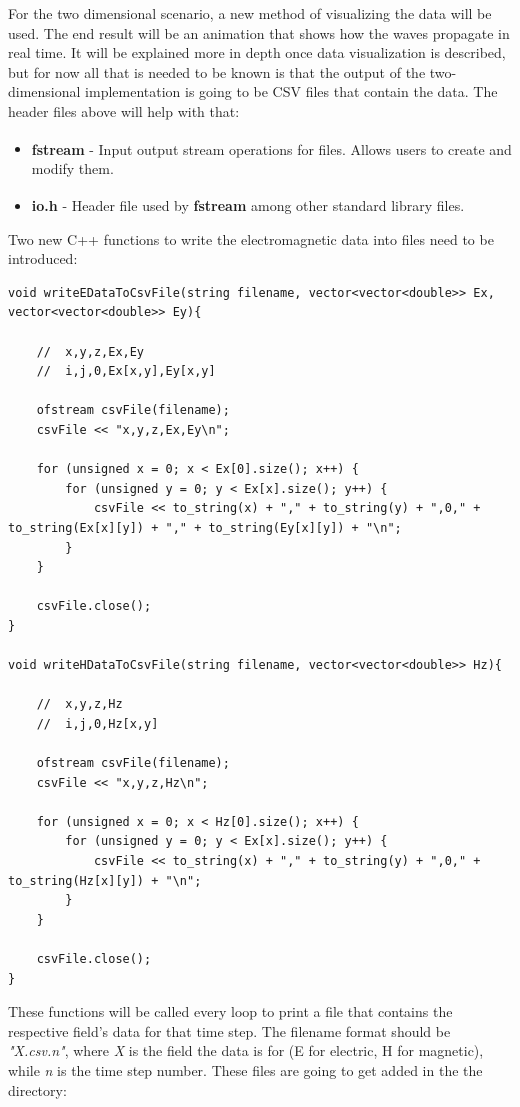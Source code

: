 For the two dimensional scenario, a new method of visualizing the data will be used. The end result will be an animation that shows how the waves propagate in real time. It will be explained more in depth once data visualization is described, but for now all that is needed to be known is that the output of the two-dimensional implementation is going to be CSV files that contain the data. The header files above will help with that:

\begin{itemize}
	\item \textbf{fstream}\textsuperscript{\cite{fstream}} - Input output stream operations for files. Allows users to create and modify them.
	\item \textbf{io.h}\textsuperscript{\cite{io.h}} - Header file used by \textbf{fstream} among other standard library files.
\end{itemize}

Two new C++ functions to write the electromagnetic data into files need to be introduced:

\begin{verbatim}
void writeEDataToCsvFile(string filename, vector<vector<double>> Ex, vector<vector<double>> Ey){
	
	//	x,y,z,Ex,Ey
	//	i,j,0,Ex[x,y],Ey[x,y]
	
	ofstream csvFile(filename);
	csvFile << "x,y,z,Ex,Ey\n";
	
	for (unsigned x = 0; x < Ex[0].size(); x++) {
		for (unsigned y = 0; y < Ex[x].size(); y++) {
			csvFile << to_string(x) + "," + to_string(y) + ",0," + to_string(Ex[x][y]) + "," + to_string(Ey[x][y]) + "\n";
		}
	}
	
	csvFile.close();
}

void writeHDataToCsvFile(string filename, vector<vector<double>> Hz){
	
	//	x,y,z,Hz
	//	i,j,0,Hz[x,y]
	
	ofstream csvFile(filename);
	csvFile << "x,y,z,Hz\n";
	
	for (unsigned x = 0; x < Hz[0].size(); x++) {
		for (unsigned y = 0; y < Ex[x].size(); y++) {
			csvFile << to_string(x) + "," + to_string(y) + ",0," + to_string(Hz[x][y]) + "\n";
		}
	}
	
	csvFile.close();
}
\end{verbatim}

These functions will be called every loop to print a file that contains the respective field's data for that time step. The filename format should be \textit{"X.csv.n"}, where \textit{X} is the field the data is for (E for electric, H for magnetic), while \textit{n} is the time step number. These files are going to get added in the the directory: 

